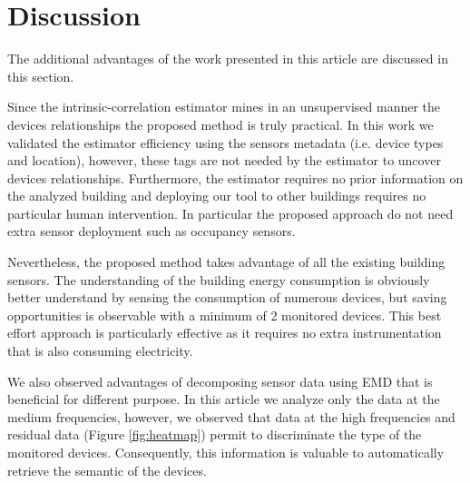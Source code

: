 \section{Discussion}
The additional advantages of the work presented in this article are discussed in this section.

Since the intrinsic-correlation estimator mines in an unsupervised manner the devices relationships the proposed method is truly practical. 
In this work we validated the estimator efficiency using the sensors metadata (i.e. device types and location), however, these tags are not needed by the estimator to uncover devices relationships.
Furthermore, the estimator requires no prior information on the analyzed building and deploying our tool to other buildings requires no particular human intervention.
In particular the proposed approach do not need extra sensor deployment such as occupancy sensors. 

Nevertheless, the proposed method takes advantage of all the existing building sensors.
The understanding of the building energy consumption is obviously better understand by sensing the consumption of numerous devices, 
but saving opportunities is observable with a minimum of 2 monitored devices.
This best effort approach is particularly effective as it requires no extra instrumentation that is also consuming electricity.


We also observed advantages of decomposing sensor data using EMD that is beneficial for different purpose.
In this article we analyze only the data at the medium frequencies, however, we observed that data at the high frequencies and residual data (Figure \ref{fig:heatmap}) permit to discriminate the type of the monitored devices.
Consequently, this information is valuable to automatically retrieve the semantic of the devices.


% 
% 


